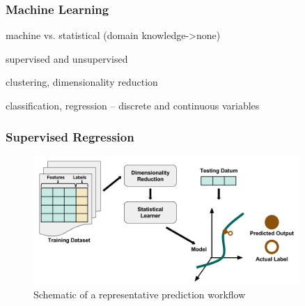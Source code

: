 \begin{frame}
  \frametitle{Machine Learning}
  machine vs. statistical (domain knowledge->none)
  
  supervised and unsupervised
  
  clustering, dimensionality reduction

  classification, regression -- discrete and continuous variables
\end{frame}

\begin{frame}
  \frametitle{Supervised Regression}
  \begin{figure}[h!]
    \centering
    \includegraphics[width=0.9\textwidth]{./figures/SupervisedRegression.png}
    \caption{Schematic of a representative prediction workflow}
  \end{figure}
\end{frame}

